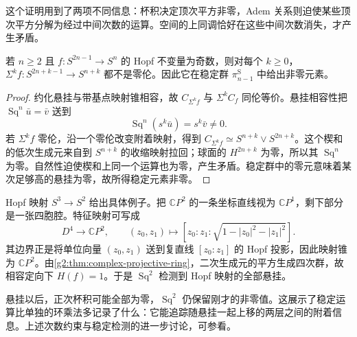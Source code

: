 这个证明用到了两项不同信息：杯积决定顶次平方非零，Adem 关系则迫使某些顶次平方分解为经过中间次数的运算。空间的上同调恰好在这些中间次数消失，才产生矛盾。

\begin{proposition}\label{g2:prop:hopf-square-stable-detection}
	若 \(n\ge2\) 且 \(f:S^{2n-1}\to S^n\) 的 Hopf 不变量为奇数，则对每个 \(k\ge0\)，\(\Sigma^k f:S^{2n+k-1}\to S^{n+k}\) 都不是零伦。因此它在稳定群 \(\pi_{n-1}^{\mathrm S}\) 中给出非零元素。
\end{proposition}
\begin{proof}
	约化悬挂与带基点映射锥相容，故 \(C_{\Sigma^k f}\) 与 \(\Sigma^k C_f\) 同伦等价。悬挂相容性把 \(\operatorname{Sq}^n\bar u=\bar v\) 送到
	\[
		\operatorname{Sq}^n(s^k\bar u)=s^k\bar v\ne0.
	\]
	若 \(\Sigma^k f\) 零伦，沿一个零伦改变附着映射，得到 \(C_{\Sigma^k f}\simeq S^{n+k}\vee S^{2n+k}\)。这个楔和的低次生成元来自到 \(S^{n+k}\) 的收缩映射拉回；球面的 \(H^{2n+k}\) 为零，所以其 \(\operatorname{Sq}^n\) 为零。自然性迫使楔和上同一个运算也为零，产生矛盾。稳定群中的零元意味着某次足够高的悬挂为零，故所得稳定元素非零。
\end{proof}

Hopf 映射 \(S^3\to S^2\) 给出具体例子。把 \(\mathbb CP^2\) 的一条坐标直线视为 \(\mathbb CP^1\)，剩下部分是一张四胞腔。特征映射可写成
\[
	D^4\longrightarrow\mathbb CP^2,\qquad
	(z_0,z_1)\longmapsto[z_0:z_1:\sqrt{1-|z_0|^2-|z_1|^2}].
\]
其边界正是将单位向量 \((z_0,z_1)\) 送到复直线 \([z_0:z_1]\) 的 Hopf 投影，因此映射锥为 \(\mathbb CP^2\)。由\cref{g2:thm:complex-projective-ring}，二次生成元的平方生成四次群，故相容定向下 \(H(f)=1\)。于是 \(\operatorname{Sq}^2\) 检测到 Hopf 映射的全部悬挂。

\ProseParagraphBreak

悬挂以后，正次杯积可能全部为零，\(\operatorname{Sq}^2\) 仍保留刚才的非零值。这展示了稳定运算比单独的环乘法多记录了什么：它能追踪随悬挂一起上移的两层之间的附着信息。上述次数约束与稳定检测的进一步讨论，可参看\cite[第4.L节，Steenrod Squares and Powers]{Hatcher2002}。
